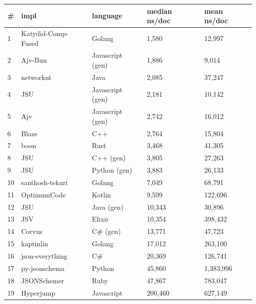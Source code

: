 \begin{tabular}{ll|l|ll}
\# & impl & language & median ns/doc & mean ns/doc \\
\hline
1 & Katydid-Comp-Fused & Golang & 1,580 & 12,997 \\
2 & Ajv-Bun & Javascript (gen) & 1,886 & 9,014 \\
3 & networknt & Java & 2,085 & 37,247 \\
4 & JSU & Javascript (gen) & 2,181 & 10,142 \\
5 & Ajv & Javascript (gen) & 2,742 & 16,012 \\
6 & Blaze & C++ & 2,764 & 15,804 \\
7 & boon & Rust & 3,468 & 41,305 \\
8 & JSU & C++ (gen) & 3,805 & 27,263 \\
9 & JSU & Python (gen) & 3,883 & 26,133 \\
10 & santhosh-tekuri & Golang & 7,049 & 68,791 \\
11 & OptimumCode & Kotlin & 9,599 & 122,696 \\
12 & JSU & Java (gen) & 10,343 & 30,896 \\
13 & JSV & Elixir & 10,354 & 398,432 \\
14 & Corvus & C\# (gen) & 13,771 & 47,723 \\
15 & kaptinlin & Golang & 17,012 & 263,100 \\
16 & json-everything & C\# & 20,369 & 126,741 \\
17 & py-jsonschema & Python & 45,860 & 1,383,996 \\
18 & JSONSchemer & Ruby & 47,867 & 783,047 \\
19 & Hyperjump & Javascript & 200,460 & 627,149 \\
\end{tabular}
